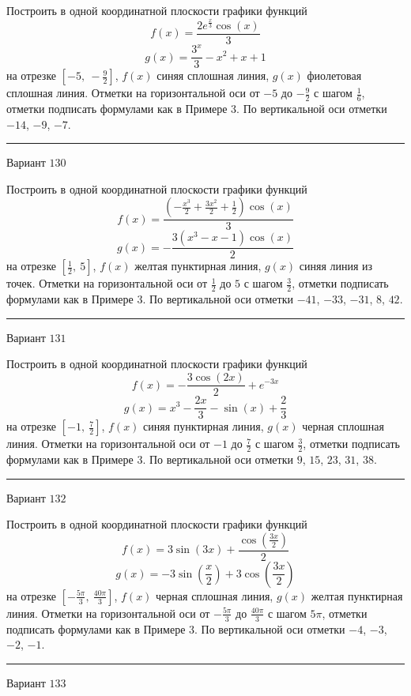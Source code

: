 \documentclass[11pt]{report}
\begin{document}
Построить в одной координатной плоскости графики функций $$f(x) = \frac{2 e^{\frac{x}{3}} \cos{\left(x \right)}}{3}$$ $$g(x) = \frac{3^{x}}{3} - x^{2} + x + 1$$ на отрезке $\left[-5, \  - \frac{9}{2}\right]$, $f(x)$ синяя сплошная линия, $g(x)$ фиолетовая сплошная линия. Отметки на горизонтальной оси от $-5$ до $- \frac{9}{2}$ с шагом $\frac{1}{6}$, отметки подписать формулами как в Примере 3. По вертикальной оси отметки $-14$, $-9$, $-7$.
\begin{center}
\noindent\rule{8cm}{0.4pt}
\end{center}
Вариант $130$


Построить в одной координатной плоскости графики функций $$f(x) = \frac{\left(- \frac{x^{3}}{2} + \frac{3 x^{2}}{2} + \frac{1}{2}\right) \cos{\left(x \right)}}{3}$$ $$g(x) = - \frac{3 \left(x^{3} - x - 1\right) \cos{\left(x \right)}}{2}$$ на отрезке $\left[\frac{1}{2}, \  5\right]$, $f(x)$ желтая пунктирная линия, $g(x)$ синяя линия из точек. Отметки на горизонтальной оси от $\frac{1}{2}$ до $5$ с шагом $\frac{3}{2}$, отметки подписать формулами как в Примере 3. По вертикальной оси отметки $-41$, $-33$, $-31$, $8$, $42$.
\begin{center}
\noindent\rule{8cm}{0.4pt}
\end{center}
Вариант $131$


Построить в одной координатной плоскости графики функций $$f(x) = - \frac{3 \cos{\left(2 x \right)}}{2} + e^{- 3 x}$$ $$g(x) = x^{3} - \frac{2 x}{3} - \sin{\left(x \right)} + \frac{2}{3}$$ на отрезке $\left[-1, \  \frac{7}{2}\right]$, $f(x)$ синяя пунктирная линия, $g(x)$ черная сплошная линия. Отметки на горизонтальной оси от $-1$ до $\frac{7}{2}$ с шагом $\frac{3}{2}$, отметки подписать формулами как в Примере 3. По вертикальной оси отметки $9$, $15$, $23$, $31$, $38$.
\begin{center}
\noindent\rule{8cm}{0.4pt}
\end{center}
Вариант $132$


Построить в одной координатной плоскости графики функций $$f(x) = 3 \sin{\left(3 x \right)} + \frac{\cos{\left(\frac{3 x}{2} \right)}}{2}$$ $$g(x) = - 3 \sin{\left(\frac{x}{2} \right)} + 3 \cos{\left(\frac{3 x}{2} \right)}$$ на отрезке $\left[- \frac{5 \pi}{3}, \  \frac{40 \pi}{3}\right]$, $f(x)$ черная сплошная линия, $g(x)$ желтая пунктирная линия. Отметки на горизонтальной оси от $- \frac{5 \pi}{3}$ до $\frac{40 \pi}{3}$ с шагом $5 \pi$, отметки подписать формулами как в Примере 3. По вертикальной оси отметки $-4$, $-3$, $-2$, $-1$.
\begin{center}
\noindent\rule{8cm}{0.4pt}
\end{center}
Вариант $133$
\end{document}
